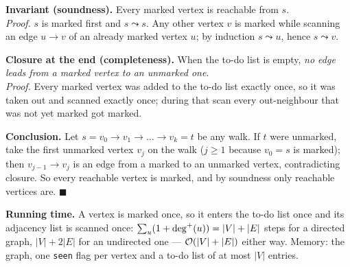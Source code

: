 \begin{diagrambox}
\end{diagrambox}

\begin{invariantbox}
\textbf{Invariant (soundness).} Every marked vertex is reachable from $s$.\\
\emph{Proof.} $s$ is marked first and $s \leadsto s$. Any other vertex $v$ is marked while scanning an edge $u \to v$ of an already marked vertex $u$; by induction $s \leadsto u$, hence $s \leadsto v$.

\smallskip
\textbf{Closure at the end (completeness).} When the to-do list is empty, \emph{no edge leads from a marked vertex to an unmarked one}.\\
\emph{Proof.} Every marked vertex was added to the to-do list exactly once, so it was taken out and scanned exactly once; during that scan every out-neighbour that was not yet marked got marked.

\smallskip
\textbf{Conclusion.} Let $s = v_0 \to v_1 \to \dots \to v_k = t$ be any walk. If $t$ were unmarked, take the first unmarked vertex $v_j$ on the walk ($j \ge 1$ because $v_0 = s$ is marked); then $v_{j-1} \to v_j$ is an edge from a marked to an unmarked vertex, contradicting closure. So every reachable vertex is marked, and by soundness only reachable vertices are. \hfill$\blacksquare$

\smallskip
\textbf{Running time.} A vertex is marked once, so it enters the to-do list once and its adjacency list is scanned once: $\sum_u (1 + \deg^{+}(u)) = |V| + |E|$ steps for a directed graph, $|V| + 2|E|$ for an undirected one --- $\mathcal{O}(|V|+|E|)$ either way. Memory: the graph, one \texttt{seen} flag per vertex and a to-do list of at most $|V|$ entries.
\end{invariantbox}

